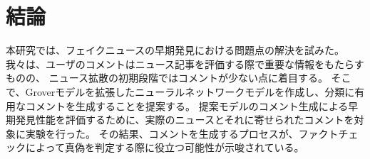 \section{結論}
本研究では、フェイクニュースの早期発見における問題点の解決を試みた。
我々は、ユーザのコメントはニュース記事を評価する際で重要な情報をもたらすものの、
ニュース拡散の初期段階ではコメントが少ない点に着目する。
そこで、Groverモデルを拡張したニューラルネットワークモデルを作成し、分類に有用なコメントを生成することを提案する。
提案モデルのコメント生成による早期発見性能を評価するために、実際のニュースとそれに寄せられたコメントを対象に実験を行った。
その結果、コメントを生成するプロセスが、ファクトチェックによって真偽を判定する際に役立つ可能性が示唆されている。